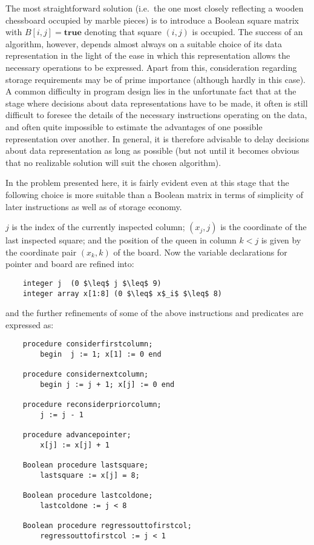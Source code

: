 The most straightforward solution (i.e.\ the one most closely reflecting a
wooden chessboard occupied by marble pieces) is to introduce a Boolean square
matrix with $B[i, j] = \textbf{true}$ denoting that square $(i, j)$ is
occupied.  The success of an algorithm, however, depends almost always on a
suitable choice of its data representation in the light of the ease in which
this representation allows the necessary operations to be expressed.  Apart
from this, consideration regarding storage requirements may be of prime
importance (although hardly in this case).  A common difficulty in program
design lies in the unfortunate fact that at the stage where decisions about
data representations have to be made, it often is still difficult to foresee
the details of the necessary instructions operating on the data, and often
quite impossible to estimate the advantages of one possible representation over
another.  In general, it is therefore advisable to delay decisions about data
representation as long as possible (but not until it becomes obvious that no
realizable solution will suit the chosen algorithm).

In the problem presented here, it is fairly evident even at this stage that the
following choice is more suitable than a Boolean matrix in terms of simplicity
of later instructions as well as of storage economy.

$j$ is the index of the currently inspected column; $(x_j, j)$ is the
coordinate of the last inspected square; and the position of the queen in
column $k < j$ is given by the coordinate pair $(x_k, k)$ of the board.  Now
the variable declarations for pointer and board are refined into:

\begin{lstlisting}
    integer j  (0 $\leq$ j $\leq$ 9)
    integer array x[1:8] (0 $\leq$ x$_i$ $\leq$ 8)
\end{lstlisting}

and the further refinements of some of the above instructions and predicates
are expressed as:

\begin{lstlisting}
    procedure considerfirstcolumn;
        begin  j := 1; x[1] := 0 end

    procedure considernextcolumn;
        begin j := j + 1; x[j] := 0 end

    procedure reconsiderpriorcolumn;
        j := j - 1

    procedure advancepointer;
        x[j] := x[j] + 1

    Boolean procedure lastsquare;
        lastsquare := x[j] = 8;

    Boolean procedure lastcoldone;
        lastcoldone := j < 8

    Boolean procedure regressouttofirstcol;
        regressouttofirstcol := j < 1
\end{lstlisting}

